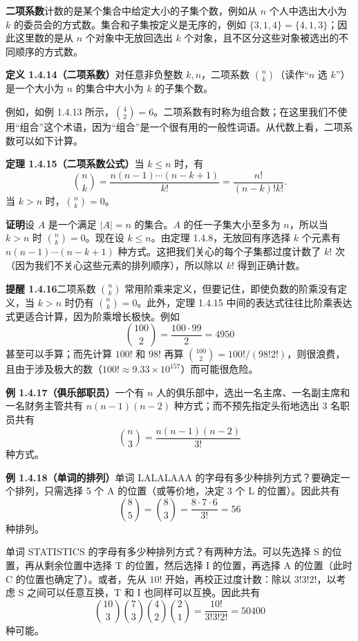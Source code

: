 \documentclass[UTF8, 12pt, fontset=fandol, oneside]{ctexart}
\begin{document}
\textbf{二项系数}计数的是某个集合中给定大小的子集个数，例如从 $n$ 个人中选出大小为 $k$ 的委员会的方式数。集合和子集按定义是无序的，例如 $\{3,1,4\}=\{4,1,3\}$；因此这里数的是从 $n$ 个对象中无放回选出 $k$ 个对象，且不区分这些对象被选出的不同顺序的方式数。

\noindent\textbf{定义 1.4.14（二项系数）}\quad 对任意非负整数 $k,n$，二项系数 $\binom{n}{k}$（读作“$n$ 选 $k$”）是一个大小为 $n$ 的集合中大小为 $k$ 的子集个数。

例如，如例 1.4.13 所示，$\binom42=6$。二项系数有时称为组合数；在这里我们不使用“组合”这个术语，因为“组合”是一个很有用的一般性词语。从代数上看，二项系数可以如下计算。

\noindent\textbf{定理 1.4.15（二项系数公式）}\quad 当 $k\le n$ 时，有
\[
  \binom{n}{k}
  =\frac{n(n-1)\cdots(n-k+1)}{k!}
  =\frac{n!}{(n-k)!k!}.
\]
当 $k>n$ 时，$\binom{n}{k}=0$。

\noindent\textbf{证明}\quad 设 $A$ 是一个满足 $|A|=n$ 的集合。$A$ 的任一子集大小至多为 $n$，所以当 $k>n$ 时 $\binom{n}{k}=0$。现在设 $k\le n$。由定理 1.4.8，无放回有序选择 $k$ 个元素有 $n(n-1)\cdots(n-k+1)$ 种方式。这把我们关心的每个子集都过度计数了 $k!$ 次（因为我们不关心这些元素的排列顺序），所以除以 $k!$ 得到正确计数。

\noindent\textbf{提醒 1.4.16}\quad 二项系数 $\binom{n}{k}$ 常用阶乘来定义，但要记住，即使负数的阶乘没有定义，当 $k>n$ 时仍有 $\binom{n}{k}=0$。此外，定理 1.4.15 中间的表达式往往比阶乘表达式更适合计算，因为阶乘增长极快。例如
\[
  \binom{100}{2}=\frac{100\cdot 99}{2}=4950
\]
甚至可以手算；而先计算 $100!$ 和 $98!$ 再算 $\binom{100}{2}=100!/(98!2!)$，则很浪费，且由于涉及极大的数（$100!\approx 9.33\times 10^{157}$）而可能很危险。

\noindent\textbf{例 1.4.17（俱乐部职员）}\quad 一个有 $n$ 人的俱乐部中，选出一名主席、一名副主席和一名财务主管共有 $n(n-1)(n-2)$ 种方式；而不预先指定头衔地选出 3 名职员共有
\[
  \binom{n}{3}=\frac{n(n-1)(n-2)}{3!}
\]
种方式。

\noindent\textbf{例 1.4.18（单词的排列）}\quad 单词 LALALAAA 的字母有多少种排列方式？要确定一个排列，只需选择 5 个 A 的位置（或等价地，决定 3 个 L 的位置）。因此共有
\[
  \binom85=\binom83=\frac{8\cdot 7\cdot 6}{3!}=56
\]
种排列。

单词 STATISTICS 的字母有多少种排列方式？有两种方法。可以先选择 S 的位置，再从剩余位置中选择 T 的位置，然后选择 I 的位置，再选择 A 的位置（此时 C 的位置也确定了）。或者，先从 $10!$ 开始，再校正过度计数：除以 $3!3!2!$，以考虑 S 之间可以任意互换，T 和 I 也同样可以互换。因此共有
\[
  \binom{10}{3}\binom73\binom42\binom21
  =\frac{10!}{3!3!2!}=50400
\]
种可能。
\end{document}
